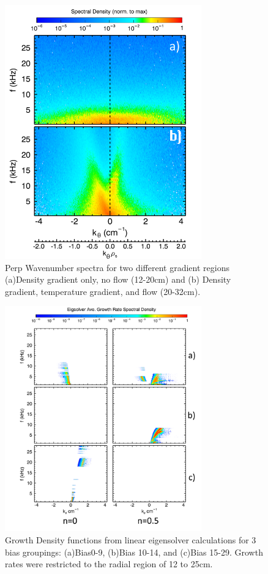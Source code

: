 \documentclass[aip,pop,amsmath,amssymb,reprint,superscriptaddress]{revtex4-1} %
\begin{document}
\begin{figure}[!htbp]
\centerline{
\includegraphics[width=8.5cm]{k_spec_byRegion_lab}}%
\caption{\label{fig:k_spec_byRegion} Perp Wavenumber spectra for two different gradient regions (a)Density gradient only, no flow (12-20cm) and (b) Density gradient, temperature gradient, and flow (20-32cm).}
\end{figure}

\begin{figure}[!htbp]
\centerline{
\includegraphics[width=8.5cm]{growth_density_12to25_lab}}%
\caption{\label{fig:growth_density_12to25} Growth Density functions from linear eigensolver calculations for 3 bias groupings: (a)Bias0-9, (b)Bias 10-14, and (c)Bias 15-29. Growth rates were restricted to the radial region of 12 to 25cm.}
\end{figure}
\end{document}
